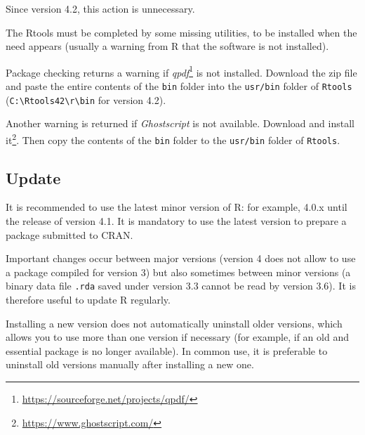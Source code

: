 \documentclass[
  12pt,
  american,
  a4paper,
  extrafontsizes,onecolumn,openright
  ]{memoir}
\newenvironment{Shaded}{\begin{snugshade}}{\end{snugshade}}
\newcommand{\AttributeTok}[1]{\textcolor[rgb]{0.77,0.63,0.00}{#1}}
\newcommand{\CommentTok}[1]{\textcolor[rgb]{0.56,0.35,0.01}{\textit{#1}}}
\newcommand{\FunctionTok}[1]{\textcolor[rgb]{0.00,0.00,0.00}{#1}}
\newcommand{\NormalTok}[1]{#1}
\newcommand{\SpecialCharTok}[1]{\textcolor[rgb]{0.00,0.00,0.00}{#1}}
\newcommand{\StringTok}[1]{\textcolor[rgb]{0.31,0.60,0.02}{#1}}
\begin{document}
\scriptsize

\begin{Shaded}
\end{Shaded}

\normalsize

Since version 4.2, this action is unnecessary.

The Rtools must be completed by some missing utilities, to be installed when the need appears (usually a warning from R that the software is not installed).

Package checking returns a warning if \emph{qpdf}\footnote{\url{https://sourceforge.net/projects/qpdf/}} is not installed.
Download the zip file and paste the entire contents of the \texttt{bin} folder into the \texttt{usr/bin} folder of \texttt{Rtools} (\texttt{C:\textbackslash{}Rtools42\textbackslash{}r\textbackslash{}bin} for version 4.2).

Another warning is returned if \emph{Ghostscript} is not available.
Download and install it\footnote{\url{https://www.ghostscript.com/}}.
Then copy the contents of the \texttt{bin} folder to the \texttt{usr/bin} folder of \texttt{Rtools}.

\hypertarget{update}{%
\subsection{Update}\label{update}}

It is recommended to use the latest minor version of R: for example, 4.0.x until the release of version 4.1.
It is mandatory to use the latest version to prepare a package submitted to CRAN.

Important changes occur between major versions (version 4 does not allow to use a package compiled for version 3) but also sometimes between minor versions (a binary data file \texttt{.rda} saved under version 3.3 cannot be read by version 3.6).
It is therefore useful to update R regularly.

Installing a new version does not automatically uninstall older versions, which allows you to use more than one version if necessary (for example, if an old and essential package is no longer available).
In common use, it is preferable to uninstall old versions manually after installing a new one.
\end{document}
